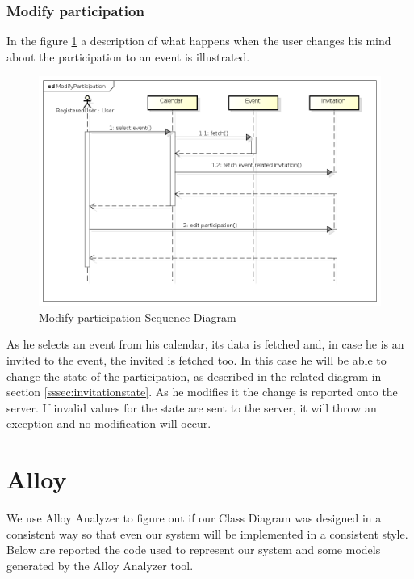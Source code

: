 \subsubsection{Modify participation}
In the figure \ref{fig:modpartseqdiag} a description of what happens when the user changes his mind about the participation to an event is illustrated.
\begin{center}
 \begin{figure}[H]
    \includegraphics[width=1\textwidth]{../UMLDiagram/sequence/ModifyParticipation/ModifyParticipation.png}
    \caption{Modify participation Sequence Diagram}
     \label{fig:modpartseqdiag}
     \end{figure}
   \end{center}
As he selects an event from his calendar, its data is fetched and, in case he is an invited to the event, the invited is fetched too. In this case he will be able to change the state of the participation, as described in the related diagram in section \ref{sssec:invitationstate}. As he modifies it the change is reported onto the server. If invalid values for the state are sent to the server, it will throw an exception and no modification will occur. 
\section{Alloy}
We use Alloy Analyzer to figure out if our Class Diagram was designed in a consistent way so that even our system will be implemented in a consistent style.\\
Below are reported the code used to represent our system and some models generated by the Alloy Analyzer tool.
